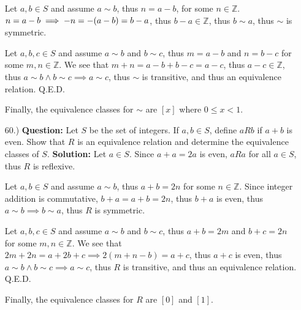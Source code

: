 \documentclass[12pt]{article}
\begin{document}
\begin{itemize}
    Let $a,b\in S$ and assume $a\sim b$, thus $n=a-b$, for some $n\in\mathbb{Z}$. $n=a-b\implies\break-n=-(a-b)=b-a$, thus $b-a\in\mathbb{Z}$, thus $b\sim a$, thus $\sim$ is symmetric.

    Let $a,b,c\in S$ and assume $a\sim b$ and $b\sim c$, thus $m=a-b$ and $n=b-c$ for some $m,n\in\mathbb{Z}$. We see that $m+n=a-b+b-c=a-c$, thus $a-c\in\mathbb{Z}$, thus $a\sim b\land b\sim c\implies a\sim c$, thus $\sim$ is transitive, and thus an equivalence relation. Q.E.D.

    Finally, the equivalence classes for $\sim$ are $[x]$ where $0\leq x<1$.

    \newpage
    \item [60.)] \textbf{Question:} Let $S$ be the set of integers. If $a,b\in S$, define $aRb$ if $a+b$ is even. Show that $R$ is an equivalence relation and determine the equivalence classes of $S$.\newline
    \textbf{Solution:} Let $a\in S$. Since $a+a=2a$ is even, $aRa$ for all $a\in S$, thus $R$ is reflexive.

    Let $a,b\in S$ and assume $a\sim b$, thus $a+b=2n$ for some $n\in\mathbb{Z}$. Since integer addition is commutative, $b+a=a+b=2n$, thus $b+a$ is even, thus $a\sim b\implies b\sim a$, thus $R$ is symmetric.

    Let $a,b,c\in S$ and assume $a\sim b$ and $b\sim c$, thus $a+b=2m$ and $b+c=2n$ for some $m,n\in\mathbb{Z}$. We see that $2m+2n=a+2b+c\implies2(m+n-b)=a+c$, thus $a+c$ is even, thus $a\sim b\land b\sim c\implies a\sim c$, thus $R$ is transitive, and thus an equivalence relation. Q.E.D.

    Finally, the equivalence classes for $R$ are $[0]$ and $[1]$.
\end{itemize}
\end{document}

